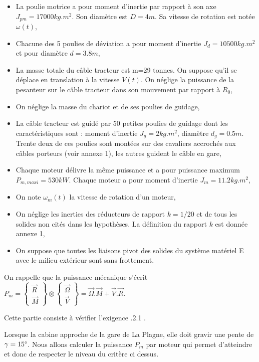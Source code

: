 \begin{itemize}
 \item La poulie motrice a pour moment d'inertie par rapport à son axe $J_{pm}=17 000 kg.m^2$. Son diamètre est $D=4m$. Sa vitesse de rotation est notée $\omega(t)$,
 \item Chacune des 5 poulies de déviation a pour moment d'inertie $J_d=10 500 kg.m^2$ et pour diamètre $d=3.8m$,
 \item La masse totale du câble tracteur est m=29 tonnes. On suppose qu'il se déplace en translation à la vitesse $V(t)$. On néglige la puissance de la pesanteur sur le câble tracteur dans son mouvement par rapport à $R_0$,
 \item On néglige la masse du chariot et de ses poulies de guidage,
 \item La câble tracteur est guidé par 50 petites poulies de guidage dont les caractéristiques sont : moment d'inertie $J_g=2 kg.m^2$, diamètre $d_g=0.5m$. Trente deux de ces poulies sont montées sur des cavaliers accrochés aux câbles porteurs (voir annexe 1), les autres guident le câble en gare,
 \item Chaque moteur délivre la même puissance et a pour puissance maximum $P_{m,maxi}=530kW$. Chaque moteur a pour moment d'inertie $J_m=11.2kg.m^2$,
 \item On note $\omega_m(t)$ la vitesse de rotation d'un moteur,
 \item On néglige les inerties des réducteurs de rapport $k=1/20$ et de tous les solides non cités dans les hypothèses. La définition du rapport $k$ est donnée annexe 1,
 \item On suppose que toutes les liaisons pivot des solides du système matériel E avec le milieu extérieur sont sans frottement.
\end{itemize}

On rappelle que la puissance mécanique s'écrit $P_m=\left\{\begin{array}{c}\overrightarrow{R} \\ \overrightarrow{M}\end{array}\right\}\otimes\left\{\begin{array}{c}\overrightarrow{\Omega} \\ \overrightarrow{V}\end{array}\right\}=\overrightarrow{\Omega}.\overrightarrow{M}+\overrightarrow{V}.\overrightarrow{R}$.

Cette partie consiste à vérifier l'exigence .2.1 \fg.

Lorsque la cabine approche de la gare de La Plagne, elle doit gravir une pente de $\gamma=15\degree$. Nous allons calculer la puissance $P_m$ par moteur qui permet d'atteindre et donc de respecter le niveau du critère ci dessus.


